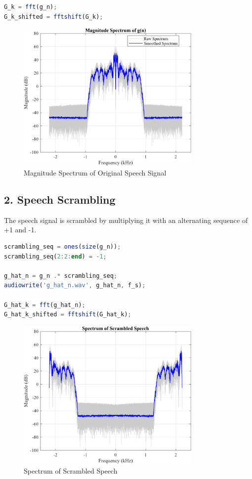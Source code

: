 \documentclass[12pt]{article}
\begin{document}
\begin{lstlisting}[language=Octave, caption=FFT of Audio Sequence]
G_k = fft(g_n);
G_k_shifted = fftshift(G_k);
\end{lstlisting}

\begin{figure}[H]
    \centering
    \includegraphics[width=0.8\textwidth]{G_k.png}
    \caption{Magnitude Spectrum of Original Speech Signal}
\end{figure}


\newpage
\subsection*{2. Speech Scrambling}
The speech signal is scrambled by multiplying it with an alternating sequence of +1 and -1. 

\begin{lstlisting}[language=Octave, caption=FFT of Hilbert Sequence]
scrambling_seq = ones(size(g_n));
scrambling_seq(2:2:end) = -1;

g_hat_n = g_n .* scrambling_seq;
audiowrite('g_hat_n.wav', g_hat_n, f_s);

G_hat_k = fft(g_hat_n);
G_hat_k_shifted = fftshift(G_hat_k);
\end{lstlisting}

\begin{figure}[H]
    \centering
    \includegraphics[width=0.8\textwidth]{G_hat_k.png}
    \caption{Spectrum of Scrambled Speech}
\end{figure}
\end{document}
